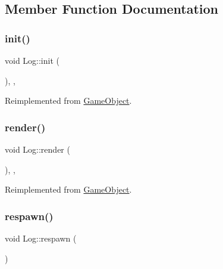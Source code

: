 \subsection{Member Function Documentation}
\mbox{\label{class_log_aa6d8efc1a2ca7c84945bd129fe92448f}} 
\subsubsection{\texorpdfstring{init()}{init()}}
{\footnotesize\ttfamily void Log\+::init (\begin{DoxyParamCaption}{ }\end{DoxyParamCaption})\hspace{0.3cm}{\ttfamily [inline]}, {\ttfamily [override]}, {\ttfamily [virtual]}}



Reimplemented from \hyperlink{class_game_object_aecb2c1b9f69715d854f7604d5d7978ec}{Game\+Object}.

\mbox{\label{class_log_a150966688120bfd2e4f29f57bbb65031}} 
\subsubsection{\texorpdfstring{render()}{render()}}
{\footnotesize\ttfamily void Log\+::render (\begin{DoxyParamCaption}{ }\end{DoxyParamCaption})\hspace{0.3cm}{\ttfamily [inline]}, {\ttfamily [override]}, {\ttfamily [virtual]}}



Reimplemented from \hyperlink{class_game_object_a484efb66a7a27c101e84c11d9905d7a6}{Game\+Object}.

\mbox{\label{class_log_a8f4f588a53320811a95a703fb1a9de8f}} 
\subsubsection{\texorpdfstring{respawn()}{respawn()}}
{\footnotesize\ttfamily void Log\+::respawn (\begin{DoxyParamCaption}{ }\end{DoxyParamCaption})\hspace{0.3cm}{\ttfamily [inline]}}

